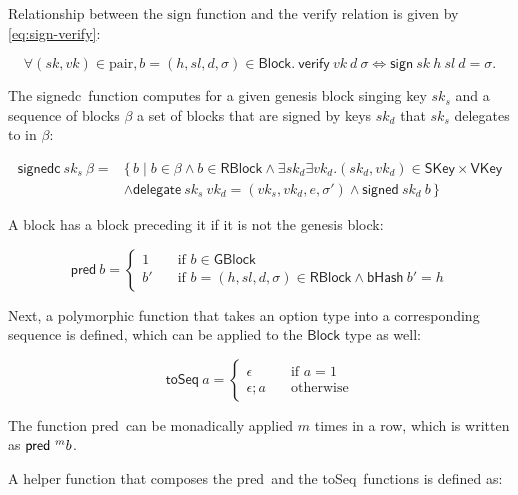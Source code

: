 \documentclass[11pt,a4paper]{article}
\newcommand\Set[2]{\{\,#1\mid#2\,\}}
\newcommand{\fun}[1]{\mathsf{#1}}
\newcommand{\type}[1]{\mathsf{#1}}
\newcommand{\GBlock}{\type{GBlock}}
\newcommand{\RBlock}{\type{RBlock}}
\newcommand{\Block}{\type{Block}}
\newcommand{\SKey}{\type{SKey}}
\newcommand{\VKey}{\type{VKey}}
\newcommand{\hashname}{bHash}
\newcommand{\signname}{sign}
\newcommand{\signedname}{signed}
\newcommand{\signedseqname}{signedc}
\newcommand{\verifyname}{verify}
\newcommand{\delegatename}{delegate}
\newcommand{\keypairname}{pair}
\newcommand{\predbname}{pred} %
\newcommand{\toseqname}{toSeq} %
\newcommand{\sign}[4]{\fun{\signname}\ #1 ~ #2 ~ #3 ~ #4}
\newcommand{\signed}[2]{\fun{\signedname}\ #1 ~ #2}
\newcommand{\signedwindow}[2]{\fun{\signedseqname}\ #1 ~ #2}
\newcommand{\verify}[3]{\fun{\verifyname} ~ #1 ~ #2 ~ #3}
\newcommand{\hash}[1]{\fun{\hashname}\ #1}
\newcommand{\delegate}[2]{\fun{\delegatename}\ #1 ~ #2}
\newcommand{\predb}[1]{\fun{\predbname} ~ #1}
\newcommand{\toseq}[1]{\fun{\toseqname} ~ #1}
\begin{document}
Relationship between the $\text{\signname}$ function and the
$\text{\verifyname}$ relation is given by \eqref{eq:sign-verify}:

\begin{equation}
  \label{eq:sign-verify}
  \forall (sk, vk) \in \text{\keypairname}, b = (h, sl, d, \sigma) \in \Block.\
  \verify{vk}{d}{\sigma} \iff \sign{sk}{h}{sl}{d} = \sigma.
\end{equation}


The \signedseqname\ function computes for a given genesis block singing key $sk_s$ and a sequence of blocks $\beta$ a set of blocks that are signed by keys $sk_d$ that $sk_s$ delegates to in $\beta$:

\begin{align}
  \label{eq:signed-window}
  \signedwindow{sk_s}{\beta} = & \Set{b}{b \in \beta \wedge b \in \RBlock \wedge \exists sk_d \exists vk_d. (sk_d, vk_d) \in \SKey \times \VKey \\
  & \wedge \delegate{sk_s}{vk_d} = (vk_s, vk_d, e, \sigma') \wedge \signed{sk_d}{b}}
\end{align}


A block has a block preceding it if it is not the genesis block:

\begin{equation}
  \label{eq:predb}
  \predb{b} =
  \begin{cases}
    1 & \quad \text{if } b \in \GBlock \\
    b' & \quad \text{if } b = (h, sl, d, \sigma) \in \RBlock \wedge \hash{b'} = h
  \end{cases}
\end{equation}

Next, a polymorphic function that takes an option type into a corresponding
sequence is defined, which can be applied to the $\Block$ type as well:

\begin{equation}
  \label{eq:toseq}
  \toseq{a} =
  \begin{cases}
    \epsilon & \quad \text{if } a = 1 \\
    \epsilon; a & \quad \text{otherwise}
  \end{cases}
\end{equation}

The function \predbname\ can be monadically applied $m$ times in a row, which
is written as $\predb^m{b}$.

A helper function that composes the \predbname\ and the \toseqname\
functions is defined as:
\end{document}
